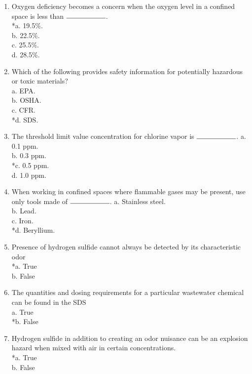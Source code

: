 \begin{enumerate}
\item Oxygen deficiency becomes a concern when the oxygen level in a confined space is less than $\rule{2cm}{0.15mm}$.\\
*a. 19.5\%.\\
b.  22.5\%.\\
c.  25.5\%.\\
d.  28.5\%.

\item Which of the following provides safety information for potentially hazardous or toxic materials?\\
a.  EPA.\\
b.  OSHA.\\
c.  CFR.\\
*d. SDS.

\item The threshold limit value concentration for chlorine vapor is $\rule{2cm}{0.15mm}$.
a.  0.1 ppm.\\
b.  0.3 ppm.\\
*c. 0.5 ppm.\\
d.  1.0 ppm.

\item When working in confined spaces where flammable gases may be present, use only tools made of $\rule{2cm}{0.15mm}$.
a.  Stainless steel.\\
b.  Lead.\\
c.  Iron.\\
*d. Beryllium.

\item Presence of hydrogen sulfide cannot always be detected by its characteristic odor \\

*a. True \\
b. False \\

\item The quantities and dosing requirements for a particular wastewater chemical can be found in the SDS \\

a. True \\
*b. False \\

\item Hydrogen sulfide in addition to creating an odor nuisance can be an explosion hazard when mixed with air in certain concentrations. \\

*a. True \\
b. False \\


\end{enumerate}
